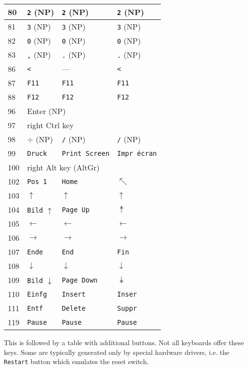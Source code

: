 \begin{longtable}{|l|l|l|l|}
  80 & \texttt{2} (NP) & \texttt{2} (NP) & \texttt{2} (NP) \\ \hline
  81 & \texttt{3} (NP) & \texttt{3} (NP) & \texttt{3} (NP) \\ \hline
  82 & \texttt{0} (NP) & \texttt{0} (NP) & \texttt{0} (NP) \\ \hline
  83 & \texttt{,} (NP) & \texttt{.} (NP) & \texttt{.} (NP) \\ \hline
  86 & \texttt{<} & --- & \texttt{<} \\ \hline
  87 & \texttt{F11} & \texttt{F11} & \texttt{F11} \\ \hline
  88 & \texttt{F12} & \texttt{F12} & \texttt{F12} \\ \hline
  96 & \multicolumn{3}{|l|}{Enter (NP)} \\ \hline
  97 & \multicolumn{3}{|l|}{right Ctrl key} \\ \hline
  98 & $\div$ (NP) & \texttt{/} (NP) & \texttt{/} (NP) \\ \hline
  99 & \texttt{Druck} & \texttt{Print Screen} & \texttt{Impr écran} \\ \hline
  100 & \multicolumn{3}{|l|}{right Alt key (AltGr)} \\ \hline
  102 & \texttt{Pos 1} & \texttt{Home} & $\nwarrow$ \\ \hline
  103 & $\uparrow$ & $\uparrow$ & $\uparrow$ \\ \hline
  104 & \texttt{Bild} $\uparrow$ & \texttt{Page Up} & $\twoheaduparrow$ \\ \hline
  105 & $\leftarrow$ & $\leftarrow$ & $\leftarrow$ \\ \hline
  106 & $\rightarrow$ & $\rightarrow$ & $\rightarrow$ \\ \hline
  107 & \texttt{Ende} & \texttt{End} & \texttt{Fin} \\ \hline
  108 & $\downarrow$ & $\downarrow$ & $\downarrow$ \\ \hline
  109 & \texttt{Bild} $\downarrow$ & \texttt{Page Down} & $\twoheaddownarrow$ \\ \hline
  110 & \texttt{Einfg} & \texttt{Insert} & \texttt{Inser} \\ \hline
  111 & \texttt{Entf} & \texttt{Delete} & \texttt{Suppr} \\ \hline
  119 & \texttt{Pause} & \texttt{Pause} & \texttt{Pause} \\ \hline
\end{longtable}

This is followed by a table with additional buttons. Not all
keyboards offer these keys. Some are typically generated only by
special hardware drivers, i.e. the \texttt{Restart} button which 
emulates the reset switch.

